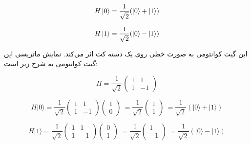 \documentclass{book}
\begin{document}
\begin{center}
	\begin{equation}\label{basis to forier}
H\ket{0} = \frac{1}{\sqrt{2}} (\ket{0} + \ket{1})
\end{equation}
\end{center}
\hspace{1cm}
\begin{center}
	\begin{equation}\label{basis to forier}
H\ket{1} = \frac{1}{\sqrt{2}} (\ket{0} - \ket{1})
\end{equation}
\end{center}
\vspace{1cm}

این گیت کوانتومی‌ به صورت خطی روی یک دسته‌ کت اثر مي‌کند. نمایش ماتریسی این گیت‌ کوانتومی به شرح زیر است:
\begin{center}
	\begin{equation}\label{Hadamard matrix}
		H = \frac{1}{\sqrt{2}}
		\begin{pmatrix}
			1 & 1 \\
			1 & -1
		\end{pmatrix}
	\end{equation}
\end{center}





	\begin{equation}\label{Hadamard matrix}
			H |0\rangle = \frac{1}{\sqrt{2}} \begin{pmatrix} 1 & 1 \\ 1 & -1 \end{pmatrix} \begin{pmatrix} 1 \\ 0 \end{pmatrix} \
		= \frac{1}{\sqrt{2}} \begin{pmatrix} 1 \\ 1 \end{pmatrix} \
		= \frac{1}{\sqrt{2}} (|0\rangle + |1\rangle)
	\end{equation}



	\begin{equation}\label{Hadamard on ket}
	H |1\rangle = \frac{1}{\sqrt{2}} \begin{pmatrix} 1 & 1 \\ 1 & -1 \end{pmatrix} \begin{pmatrix} 0 \\ 1 \end{pmatrix} \
	= \frac{1}{\sqrt{2}} \begin{pmatrix} 1 \\ -1 \end{pmatrix} \
	= \frac{1}{\sqrt{2}} (|0\rangle - |1\rangle)
\end{equation}
\end{document}
